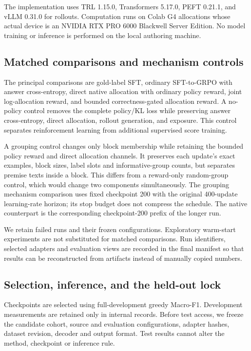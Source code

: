 \documentclass[11pt]{article}
\begin{document}
The implementation uses TRL 1.15.0, Transformers 5.17.0, PEFT 0.21.1, and vLLM 0.31.0 for rollouts. Computation runs on Colab G4 allocations whose actual device is an NVIDIA RTX PRO 6000 Blackwell Server Edition. No model training or inference is performed on the local authoring machine.

\subsection{Matched comparisons and mechanism controls}
The principal comparisons are gold-label SFT, ordinary SFT-to-GRPO with answer cross-entropy, direct native allocation with ordinary policy reward, joint log-allocation reward, and bounded correctness-gated allocation reward. A no-policy control removes the complete policy/KL loss while preserving answer cross-entropy, direct allocation, rollout generation, and exposure. This control separates reinforcement learning from additional supervised score training.

A grouping control changes only block membership while retaining the bounded policy reward and direct allocation channels. It preserves each update's exact examples, block sizes, label slots and informative-group counts, but separates premise texts inside a block. This differs from a reward-only random-group control, which would change two components simultaneously. The grouping mechanism comparison uses fixed checkpoint 200 with the original 400-update learning-rate horizon; its stop budget does not compress the schedule. The native counterpart is the corresponding checkpoint-200 prefix of the longer run.

We retain failed runs and their frozen configurations. Exploratory warm-start experiments are not substituted for matched comparisons. Run identifiers, selected adapters and evaluation views are recorded in the final manifest so that results can be reconstructed from artifacts instead of manually copied numbers.

\subsection{Selection, inference, and the held-out lock}
Checkpoints are selected using full-development greedy Macro-F1. Development measurements are retained only in internal records. Before test access, we freeze the candidate cohort, source and evaluation configurations, adapter hashes, dataset revision, decoder and output format. Test results cannot alter the method, checkpoint or inference rule.
\end{document}

